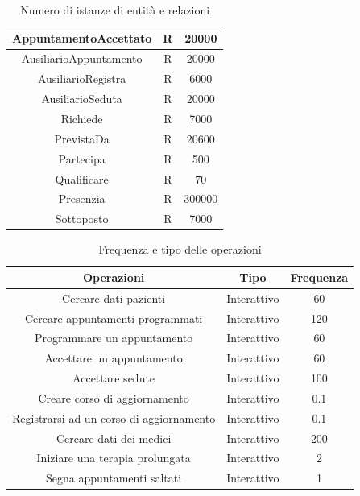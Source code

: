 \documentclass[11pt]{article}
\begin{document}
\begin{table}[H]
\begin{tabular}{|c|c|c|}
\hline AppuntamentoAccettato     & R             & 20000              \\
\hline AusiliarioAppuntamento    & R             & 20000              \\
\hline AusiliarioRegistra        & R             & 6000               \\
\hline AusiliarioSeduta          & R             & 20000              \\
\hline Richiede                  & R             & 7000               \\
\hline PrevistaDa                & R             & 20600              \\
\hline Partecipa                 & R             & 500                \\
\hline Qualificare               & R             & 70                 \\
\hline Presenzia                 & R             & 300000             \\
\hline Sottoposto                & R             & 7000               \\
\hline
\end{tabular}
    \caption{Numero di istanze di entità e relazioni}
    \label{tab:istanze}
\end{table}

\begin{table}[H]
\begin{tabular}{|c|c|c|}
\hline \textbf{Operazioni}                      & \textbf{Tipo} & \textbf{Frequenza} \\
\hline Cercare dati pazienti                    & Interattivo   & 60                 \\
\hline Cercare appuntamenti programmati         & Interattivo   & 120                \\
\hline Programmare un appuntamento              & Interattivo   & 60                 \\
\hline Accettare un appuntamento                & Interattivo   & 60                 \\
\hline Accettare sedute                         & Interattivo   & 100                \\
\hline Creare corso di aggiornamento            & Interattivo   & 0.1                \\
\hline Registrarsi ad un corso di aggiornamento & Interattivo   & 0.1                \\
\hline Cercare dati dei medici                  & Interattivo   & 200                \\
\hline Iniziare una terapia prolungata          & Interattivo   & 2                  \\
\hline Segna appuntamenti saltati               & Interattivo   & 1                  \\
\hline
\end{tabular}
    \caption{Frequenza e tipo delle operazioni}
    \label{tab:operazioni}
\end{table}
\end{document}
